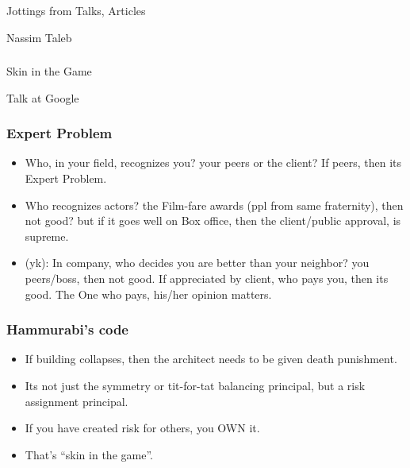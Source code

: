 \begin{frame}[fragile]\frametitle{}
\begin{center}
{\Large Jottings from Talks, Articles}

{\small Nassim Taleb}


\end{center}
\end{frame}



\begin{frame}[fragile]\frametitle{}
\begin{center}
{\large Skin in the Game}

{\small Talk at Google}


\end{center}
\end{frame}



\begin{frame}[fragile]\frametitle{Expert Problem}

\begin{itemize}
\item Who, in your field, recognizes you? your peers or the client? If peers, then its Expert Problem.
\item Who recognizes actors? the Film-fare awards (ppl from same fraternity), then not good? but if it goes well on Box office, then the client/public approval, is supreme.
\item (yk): In company, who decides you are better than your neighbor? you peers/boss, then not good. If appreciated by client, who pays you, then its good.
The One who pays, his/her opinion matters.
\end{itemize}

\end{frame}


\begin{frame}[fragile]\frametitle{Hammurabi's code}

\begin{itemize}
\item If building collapses, then the architect needs to be given death punishment.
\item Its not just the symmetry or  tit-for-tat balancing principal, but a risk assignment principal.
\item If you have created risk for others, you OWN it.
\item That's ``skin in the game''.
\end{itemize}
\end{frame}

